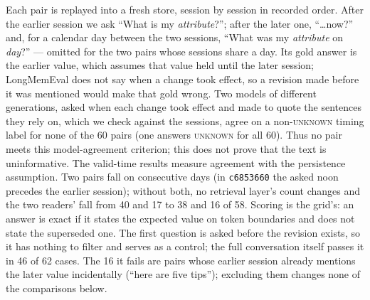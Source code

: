 \documentclass[conference]{IEEEtran}
\begin{document}
Each pair is replayed into a fresh store, session by session in recorded order.
After the earlier session we ask ``What is my \emph{attribute}?''; after the
later one, ``\ldots now?'' and, for a calendar day between the two sessions,
``What was my \emph{attribute} on \emph{day}?'' --- omitted for the two pairs
whose sessions share a day. Its gold answer is the earlier value, which assumes
that value held until the later session; LongMemEval does not say when a change
took effect, so a revision made before it was mentioned would make that gold
wrong. Two models of different generations, asked when each change took
effect and made to quote the sentences they rely on, which we check against the
sessions, agree on a non-\textsc{unknown} timing label for none of the 60
pairs (one answers \textsc{unknown} for all 60). Thus no pair meets this
model-agreement criterion; this does not prove that the text is uninformative.
The valid-time results measure agreement with the persistence assumption. Two
pairs fall on consecutive days (in \texttt{c6853660} the asked noon precedes the
earlier session); without both, no retrieval layer's count changes and the two
readers' fall from 40 and 17 to 38 and 16 of 58. Scoring is the grid's: an answer is exact if it
states the expected value on token boundaries and does not state the
superseded one. The first question is asked before the revision exists, so it
has nothing to filter and serves as a control; the full conversation itself
passes it in 46 of 62 cases. The 16 it fails are pairs whose earlier session
already mentions the later value incidentally (``here are five tips'');
excluding them changes none of the comparisons below.
\end{document}

